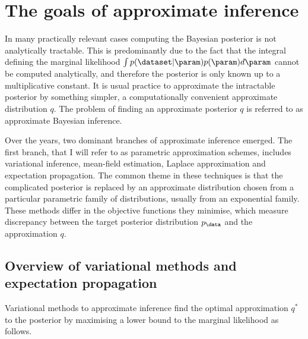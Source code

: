 
\section{The goals of approximate inference}

In many practically relevant cases computing the Bayesian posterior is not analytically tractable. This is predominantly due to the fact that the integral defining the marginal likelihood $\int p(\dataset\vert\param)p(\param)d\param$ cannot be computed analytically, and therefore the posterior is only known up to a multiplicative constant. It is usual practice to approximate the intractable posterior by something simpler, a computationally convenient approximate distribution $q$. The problem of finding an approximate posterior $q$ is referred to as approximate Bayesian inference.

Over the years, two dominant branches of approximate inference emerged. The first branch, that I will refer to as parametric approximation schemes, includes variational inference, mean-field estimation, Laplace approximation and expectation propagation. The common theme in these techniques is that the complicated posterior is replaced by an approximate distribution chosen from a particular parametric family of distributions, usually from an exponential family. These methods differ in the objective functions they minimise, which measure discrepancy between the target posterior distribution $p_\data$ and the approximation $q$.

\subsection{Overview of variational methods and expectation propagation}

Variational methods to approximate inference find the optimal approximation $q^{*}$ to the posterior by maximising a lower bound to the marginal likelihood as follows.

